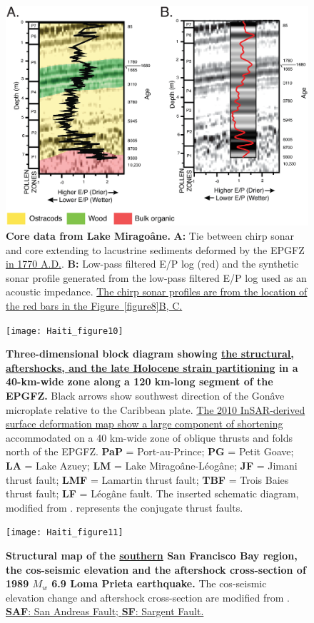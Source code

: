 \documentclass[linenumbers,draft]{agujournal}
\begin{document}
\begin{figure}
\centering
\includegraphics[width=\textwidth]{Haiti_figure9}
\caption{\textbf{Core data from Lake Mirago\^ane.} \textbf{A:} Tie between chirp sonar and core \citep{higuera199910} extending to lacustrine sediments deformed by the EPGFZ \underline{in 1770 A.D.}. \textbf{B:} Low-pass filtered E/P log (red) and the synthetic sonar profile generated from the low-pass filtered E/P log used as an acoustic impedance. \underline{The chirp sonar profiles are from the location of the red bars in the Figure~\ref{figure8}B, C.}}
\label{figure9}
\end{figure}

\begin{figure}
\centering
\texttt{[image: Haiti\_figure10]}
\caption{\textbf{Three-dimensional block diagram showing \ul{the structural, aftershocks, and the late Holocene strain partitioning} in a 40-km-wide zone along a 120 km-long segment of the EPGFZ.} Black arrows show southwest direction of the Gon\^ave microplate relative to the Caribbean plate. \ul{The 2010 InSAR-derived surface deformation map show a large component of shortening} accommodated on a 40 km-wide zone of oblique thrusts and folds north of the EPGFZ. \textbf{PaP} = Port-au-Prince; \textbf{PG} = Petit Goave; \textbf{LA} = Lake Azuey; \textbf{LM} = Lake Mirago\^ane-L\'eog\^ane; \textbf{JF} = Jimani thrust fault; \textbf{LMF} = Lamartin thrust fault; \textbf{TBF} = Trois Baies thrust fault; \textbf{LF} = L\'eog\^ane fault. The inserted schematic diagram, modified from \citet{sibson2012reverse}. represents the conjugate thrust faults.}
\label{figure10}
\end{figure}

\begin{figure}
\centering
\texttt{[image: Haiti\_figure11]}
\caption{\textbf{Structural map of the \ul{southern} San Francisco Bay region, the cos-seismic elevation and the aftershock cross-section of 1989 $M_w$ 6.9  Loma Prieta earthquake.} The cos-seismic elevation change and aftershock cross-section are modified from \citet{marshall1991faulting}. \ul{\textbf{SAF}: San Andreas Fault; \textbf{SF}: Sargent Fault.}}
\label{figure11}
\end{figure}
\end{document}
